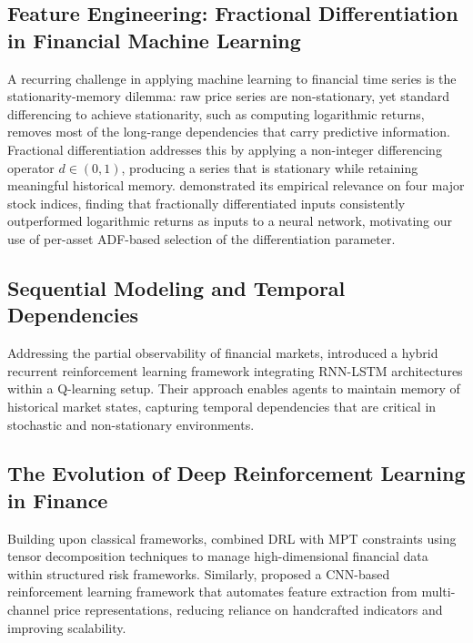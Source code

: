 \documentclass[final]{article}
\begin{document}
\subsection{Feature Engineering: Fractional Differentiation in Financial
Machine Learning}
A recurring challenge in applying machine learning to financial time series is the stationarity-memory dilemma: raw
price series are non-stationary, yet standard differencing to achieve stationarity, such as computing logarithmic
returns, removes most of the long-range dependencies that carry predictive information. Fractional differentiation
addresses this by applying a non-integer differencing operator $d \in (0, 1)$, producing a series that is stationary
while retaining meaningful historical memory. \citet{stempień2025comparativeanalysisfinancialdata} demonstrated its
empirical relevance on four major stock indices, finding that fractionally differentiated inputs consistently
outperformed logarithmic returns as inputs to a neural network, motivating our use of per-asset ADF-based selection of
the differentiation parameter.

\subsection{Sequential Modeling and Temporal Dependencies}
Addressing the partial observability of financial markets, \citet{li2015recurrent} introduced a hybrid recurrent
reinforcement learning framework integrating RNN-LSTM architectures within a Q-learning setup. Their approach enables
agents to maintain memory of historical market states, capturing temporal dependencies that are critical in stochastic
and non-stationary environments.

\subsection{The Evolution of Deep Reinforcement Learning in Finance}
Building upon classical frameworks, \citet{jang2023deep} combined DRL with MPT constraints using tensor decomposition
techniques to manage high-dimensional financial data within structured risk frameworks. Similarly, \citet{jiang2017deep}
proposed a CNN-based reinforcement learning framework that automates feature extraction from multi-channel price
representations, reducing reliance on handcrafted indicators and improving scalability.
\end{document}
